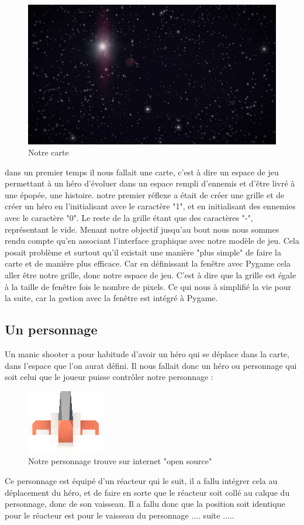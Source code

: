 \documentclass[a4paper, 11pt]{article}
\begin{document}
 	\begin{figure}[ht!]
\centering
\includegraphics[width=0.8\linewidth]{Background.jpg}
\caption{Notre carte}
\end{figure}
 	dans un premier temps il nous fallait une carte, c'est à dire un espace de jeu permettant à un héro d'évoluer dans un espace rempli d'ennemis et d'être livré à une épopée, une histoire. 
 	notre premier réflexe a était de créer une grille et de créer un héro en l'initialisant avce le caractère "1", et en initialisant des ennemies avec le caractère  "0". Le reste de la grille étant que des caractères  "-", représentant le vide. Menant notre objectif jusqu'au bout nous nous sommes rendu compte qu'en associant l'interface graphique avec notre modèle de jeu. Cela posait problème et surtout qu'il existait une manière "plus simple" de faire la carte et de manière plus efficace. Car en définissant la fenêtre avec Pygame cela aller être notre grille, donc notre espace de jeu. C'est à dire que la grille est égale à la taille de fenêtre fois le nombre de pixels. Ce qui nous à simplifié la vie pour la suite, car la gestion avec la fenêtre est intégré à Pygame.

 	
	\subsection{Un personnage}
Un manic shooter a pour habitude d'avoir un héro qui se déplace dans la carte, dans l'espace que l'on aurat défini. Il nous fallait donc un héro ou personnage qui soit celui que le joueur puisse contrôler notre personnage :
\begin{figure}[ht!]
\centering
\includegraphics[width=0.1\linewidth]{spaceCraft1.png}
\caption{Notre personnage trouve sur internet "open source"}
\end{figure}
Ce personnage est équipé d'un réacteur qui le suit, il a fallu intégrer cela au déplacement du héro, et de faire en sorte que le réacteur soit collé au calque du personnage, donc de son vaisseau. Il a fallu donc que la position soit identique pour le réacteur est pour le vaisseau du personnage .... suite .....
\end{document}
